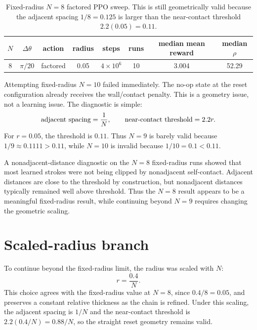 \documentclass[11pt]{article}
\newcommand{\dth}{\Delta\theta}
\begin{document}
\begin{table}[htbp]
\centering
\scriptsize
\begin{tabular}{cccccccc}
\toprule
$N$ & $\dth$ & action & radius & steps & runs & median mean reward & median $\rho$ \\
\midrule
8 & $\pi/20$ & factored & 0.05 & $4\times 10^6$ & 10 & 3.004 & 52.29 \\
\bottomrule
\end{tabular}
\caption{Fixed-radius $N=8$ factored PPO sweep. This is still geometrically valid because the adjacent spacing $1/8=0.125$ is larger than the near-contact threshold $2.2(0.05)=0.11$.}
\label{tab:phase6-n8-fixed}
\end{table}

Attempting fixed-radius $N=10$ failed immediately. The no-op state at the reset configuration already receives the wall/contact penalty. This is a geometry issue, not a learning issue. The diagnostic is simple:
\begin{equation}
\hbox{adjacent spacing} = \frac{1}{N}, \qquad
\hbox{near-contact threshold} = 2.2r .
\end{equation}
For $r=0.05$, the threshold is $0.11$. Thus $N=9$ is barely valid because $1/9 \approx 0.1111 > 0.11$, while $N=10$ is invalid because $1/10=0.1 < 0.11$.

A nonadjacent-distance diagnostic on the $N=8$ fixed-radius runs showed that most learned strokes were not being clipped by nonadjacent self-contact. Adjacent distances are close to the threshold by construction, but nonadjacent distances typically remained well above threshold. Thus the $N=8$ result appears to be a meaningful fixed-radius result, while continuing beyond $N=9$ requires changing the geometric scaling.

\section{Scaled-radius branch}

To continue beyond the fixed-radius limit, the radius was scaled with $N$:
\begin{equation}
 r = \frac{0.4}{N} .
\end{equation}
This choice agrees with the fixed-radius value at $N=8$, since $0.4/8=0.05$, and preserves a constant relative thickness as the chain is refined. Under this scaling, the adjacent spacing is $1/N$ and the near-contact threshold is $2.2(0.4/N)=0.88/N$, so the straight reset geometry remains valid.
\end{document}
